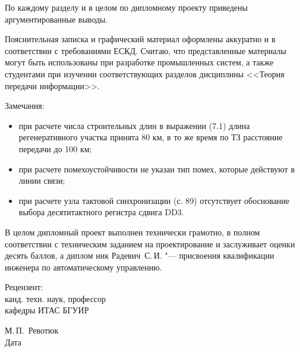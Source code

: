 \begin{singlespace}
{По каждому разделу и в целом по дипломному проекту приведены аргументированные выводы.

Пояснительная записка и графический материал оформлены аккуратно и в соответствии с требованиями ЕСКД.
Считаю, что представленные материалы могут быть использованы при разработке промышленных систем, а также студентами при изучении соответствующих разделов дисциплины <<Теория передачи информации>>.

Замечания:
\begin{itemize}
  \item при расчете числа строительных длин в выражении (7.1) длина регенеративного участка принята 80 км, в то же время по ТЗ расстояние передачи до 100 км;
  \item при расчете помехоустойчивости не указан тип помех, которые действуют в линии связи;
  \item при расчете узла тактовой синхронизации (с. 89) отсутствует обоснование выбора десятитактного регистра сдвига DD3.
\end{itemize}

В целом дипломный проект выполнен технически грамотно, в полном соответствии с техническим заданием на проектирование и заслуживает оценки десять баллов, а диплом
ник Радевич~С.\,И. "--- присвоения квалификации инженера по автоматическому управлению.

  \vfill
  \noindent
  \begin{minipage}{0.4\textwidth}
    \begin{flushleft}
      Рецензент:\\
      канд. техн. наук, профессор\\
      кафедры ИТАС БГУИР
    \end{flushleft}
  \end{minipage}
  \begin{minipage}{0.58\textwidth}
    \begin{flushright}
    \underline{\hspace*{3cm}}\hspace*{0.5cm}\underline{\hspace*{2cm}} М.\,П.~Ревотюк \\
    Дата\hspace*{6.5cm}
    \end{flushright}
  \end{minipage}
}

\end{singlespace}
\clearpage
